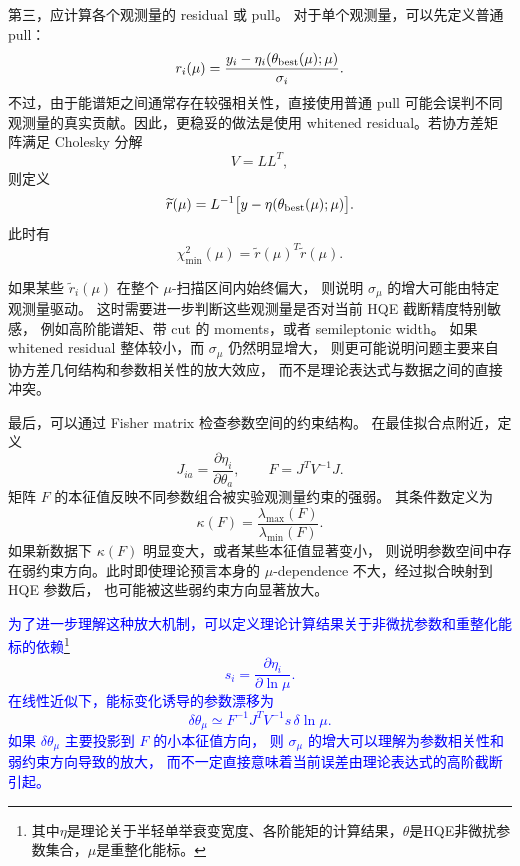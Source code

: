 第三，应计算各个观测量的 residual 或 pull。
对于单个观测量，可以先定义普通 pull：
\begin{equation}
    r_i(\mu)
    =
    \frac{
    y_i-\eta_i(\theta_{\rm best}(\mu);\mu)
    }{
    \sigma_i
    } .
\end{equation}
不过，由于能谱矩之间通常存在较强相关性，直接使用普通 pull
可能会误判不同观测量的真实贡献。因此，更稳妥的做法是使用
whitened residual。若协方差矩阵满足 Cholesky 分解
\begin{equation}
    V = L L^T ,
\end{equation}
则定义
\begin{equation}
    \widetilde r(\mu)
    =
    L^{-1}
    \bigl[
    y-\eta(\theta_{\rm best}(\mu);\mu)
    \bigr] .
\end{equation}
此时有
\begin{equation}
    \chi^2_{\min}(\mu)
    =
    \widetilde r(\mu)^T \widetilde r(\mu).
\end{equation}

如果某些 \(\widetilde r_i(\mu)\) 在整个 \(\mu\)-扫描区间内始终偏大，
则说明 \(\sigma_\mu\) 的增大可能由特定观测量驱动。
这时需要进一步判断这些观测量是否对当前 HQE 截断精度特别敏感，
例如高阶能谱矩、带 cut 的 moments，或者 semileptonic width。
如果 whitened residual 整体较小，而 \(\sigma_\mu\) 仍然明显增大，
则更可能说明问题主要来自协方差几何结构和参数相关性的放大效应，
而不是理论表达式与数据之间的直接冲突。

最后，可以通过 Fisher matrix 检查参数空间的约束结构。
在最佳拟合点附近，定义
\begin{equation}
    J_{ia}
    =
    \frac{\partial \eta_i}{\partial \theta_a},
    \qquad
    F
    =
    J^T V^{-1}J .
\end{equation}
矩阵 \(F\) 的本征值反映不同参数组合被实验观测量约束的强弱。
其条件数定义为
\begin{equation}
    \kappa(F)
    =
    \frac{\lambda_{\max}(F)}{\lambda_{\min}(F)} .
\end{equation}
如果新数据下 \(\kappa(F)\) 明显变大，或者某些本征值显著变小，
则说明参数空间中存在弱约束方向。此时即使理论预言本身的
\(\mu\)-dependence 不大，经过拟合映射到 HQE 参数后，
也可能被这些弱约束方向显著放大。

\textcolor{blue}{为了进一步理解这种放大机制，可以定义理论计算结果关于非微扰参数和重整化能标的依赖\footnote{其中$\eta$是理论关于半轻单举衰变宽度、各阶能矩的计算结果，$\theta$是HQE非微扰参数集合，$\mu$是重整化能标。}
\begin{equation}
    s_i
    =
    \frac{\partial \eta_i}{\partial \ln\mu}.
\end{equation}
在线性近似下，能标变化诱导的参数漂移为
\begin{equation}
    \delta\theta_\mu
    \simeq
    F^{-1}J^T V^{-1}s\,\delta\ln\mu .
\end{equation}
如果 \(\delta\theta_\mu\) 主要投影到 \(F\) 的小本征值方向，
则 \(\sigma_\mu\) 的增大可以理解为参数相关性和弱约束方向导致的放大，
而不一定直接意味着当前误差由理论表达式的高阶截断引起。}

